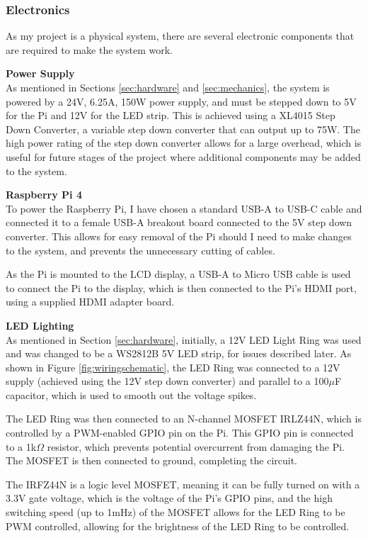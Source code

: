 \subsubsection{Electronics}
As my project is a physical system, there are several electronic components that are required to make the system work.

\noindent
\textbf{Power Supply} \\
As mentioned in Sections \ref*{sec:hardware} and \ref*{sec:mechanics}, the system is powered by a 24V, 6.25A, 150W power supply, and must
be stepped down to 5V for the Pi and 12V for the LED strip. This is achieved using a XL4015 Step Down Converter\cite{xl4015}, a variable
step down converter that can output up to 75W.
The high power rating of the step down converter allows for a large overhead, which is useful for future stages of the project where 
additional components may be added to the system.

\noindent
\textbf{Raspberry Pi 4} \\
To power the Raspberry Pi, I have chosen a standard USB-A to USB-C cable and connected it to a female USB-A breakout board connected to the
5V step down converter. This allows for easy removal of the Pi should I need to make changes to the system, and prevents the unnecessary
cutting of cables.

As the Pi is mounted to the LCD display, a USB-A to Micro USB cable is used to connect the Pi to the display, which is then connected to the
Pi's HDMI port, using a supplied HDMI adapter board.

\noindent
\textbf{LED Lighting} \\
As mentioned in Section \ref*{sec:hardware}, initially, a 12V LED Light Ring was used and was changed to be a WS2812B 5V LED strip, for issues described 
later. As shown in Figure \ref*{fig:wiringschematic}, the LED Ring was connected to a 12V supply (achieved using the 12V step down converter) and
parallel to a 100$\mu$F capacitor, which is used to smooth out the voltage spikes.

The LED Ring was then connected to an N-channel MOSFET IRLZ44N\cite{irlz44n}, which is controlled by a PWM-enabled GPIO pin on the Pi.
This GPIO pin is connected to a 1k$\Omega$ resistor, which prevents potential overcurrent from damaging the Pi. The MOSFET is then connected to ground, completing the circuit.

The IRFZ44N is a logic level MOSFET, meaning it can be fully turned on with a 3.3V gate voltage, which is the voltage of the Pi's GPIO pins, and the high
switching speed (up to 1mHz) of the MOSFET allows for the LED Ring to be PWM controlled, allowing for the brightness of the LED Ring to be controlled.